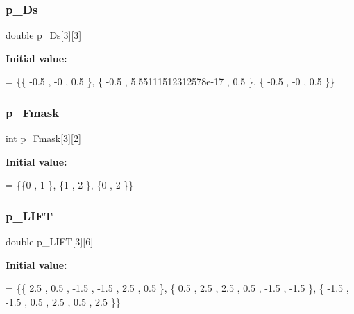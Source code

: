 \subsubsection{\texorpdfstring{p\+\_\+\+Ds}{p\_Ds}}
{\footnotesize\ttfamily double p\+\_\+\+Ds\mbox{[}3\mbox{]}\mbox{[}3\mbox{]}}

{\bfseries Initial value\+:}
\begin{DoxyCode}
= \{\{             -0.5 ,                -0 ,               0.5 \},
\{             -0.5 , 5.55111512312578e-17 ,               0.5 \},
\{             -0.5 ,                -0 ,               0.5 \}\}
\end{DoxyCode}
\mbox{\label{a00506_a19c5c57b7dc71eb0fbdc015125cce46a}} 
\subsubsection{\texorpdfstring{p\+\_\+\+Fmask}{p\_Fmask}}
{\footnotesize\ttfamily int p\+\_\+\+Fmask\mbox{[}3\mbox{]}\mbox{[}2\mbox{]}}

{\bfseries Initial value\+:}
\begin{DoxyCode}
= \{\{0 , 1 \},
\{1 , 2 \},
\{0 , 2 \}\}
\end{DoxyCode}
\mbox{\label{a00506_a162ef160c01b03cd05791dc9a6acc934}} 
\subsubsection{\texorpdfstring{p\+\_\+\+L\+I\+FT}{p\_LIFT}}
{\footnotesize\ttfamily double p\+\_\+\+L\+I\+FT\mbox{[}3\mbox{]}\mbox{[}6\mbox{]}}

{\bfseries Initial value\+:}
\begin{DoxyCode}
= \{\{              2.5 ,               0.5 ,              -1.5 ,              -1.5 ,               2.5 ,    
                 0.5 \},
\{              0.5 ,               2.5 ,               2.5 ,               0.5 ,              -1.5 ,       
             -1.5 \},
\{             -1.5 ,              -1.5 ,               0.5 ,               2.5 ,               0.5 ,       
              2.5 \}\}
\end{DoxyCode}
\mbox{\label{a00506_a7e52da56416e11a4783c0aa859d6b478}} 
